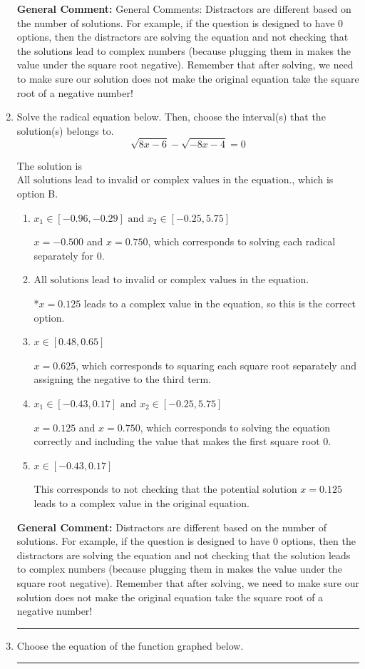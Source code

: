 \documentclass{extbook}[14pt]
\newcommand{\litem}[1]{\item #1

\rule{\textwidth}{0.4pt}}
\begin{document}
\begin{enumerate}
{\textbf{General Comment:} General Comments: Distractors are different based on the number of solutions. For example, if the question is designed to have 0 options, then the distractors are solving the equation and not checking that the solutions lead to complex numbers (because plugging them in makes the value under the square root negative). Remember that after solving, we need to make sure our solution does not make the original equation take the square root of a negative number!
}
\litem{
Solve the radical equation below. Then, choose the interval(s) that the solution(s) belongs to.
\[ \sqrt{8 x - 6} - \sqrt{-8 x - 4} = 0 \]

The solution is \( \text{All solutions lead to invalid or complex values in the equation.} \), which is option B.\begin{enumerate}[label=\Alph*.]
\item \( x_1 \in [-0.96, -0.29] \text{ and } x_2 \in [-0.25,5.75] \)

$x = -0.500$ and $x = 0.750$, which corresponds to solving each radical separately for 0.
\item \( \text{All solutions lead to invalid or complex values in the equation.} \)

*$x = 0.125$ leads to a complex value in the equation, so this is the correct option.
\item \( x \in [0.48,0.65] \)

$x = 0.625$, which corresponds to squaring each square root separately and assigning the negative to the third term.
\item \( x_1 \in [-0.43, 0.17] \text{ and } x_2 \in [-0.25,5.75] \)

$x = 0.125$ and $x = 0.750$, which corresponds to solving the equation correctly and including the value that makes the first square root 0.
\item \( x \in [-0.43,0.17] \)

This corresponds to not checking that the potential solution $x = 0.125$ leads to a complex value in the original equation.
\end{enumerate}

\textbf{General Comment:} Distractors are different based on the number of solutions. For example, if the question is designed to have 0 options, then the distractors are solving the equation and not checking that the solution leads to complex numbers (because plugging them in makes the value under the square root negative). Remember that after solving, we need to make sure our solution does not make the original equation take the square root of a negative number!
}
\litem{
Choose the equation of the function graphed below.

}
\end{enumerate}
\end{document}
